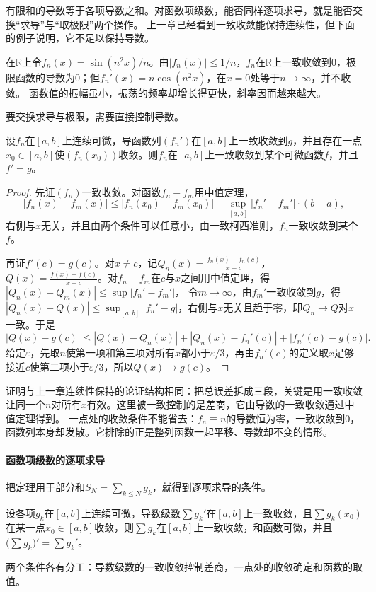 有限和的导数等于各项导数之和。对函数项级数，能否同样逐项求导，就是能否交换“求导”与“取极限”两个操作。
上一章已经看到一致收敛能保持连续性，但下面的例子说明，它不足以保持导数。
\begin{example}[一致收敛而导数不收敛的函数列]
\label{ex:ru-uniform-not-derivative}
在$\mathbb R$上令$f_n(x)=\sin(n^2x)/n$。由$|f_n(x)|\leq1/n$，$f_n$在$\mathbb R$上一致收敛到$0$，极限函数的导数为$0$；但$f_n'(x)=n\cos(n^2x)$，在$x=0$处等于$n\to\infty$，并不收敛。
函数值的振幅虽小，振荡的频率却增长得更快，斜率因而越来越大。
\end{example}
要交换求导与极限，需要直接控制导数。
\begin{theorem}[函数列的求导与极限交换]
\label{thm:ru-uniform-derivative-limit}
设$f_n$在$[a,b]$上连续可微，导函数列$(f_n')$在$[a,b]$上一致收敛到$g$，并且存在一点$x_0\in[a,b]$使$(f_n(x_0))$收敛。则$f_n$在$[a,b]$上一致收敛到某个可微函数$f$，并且$f'=g$。
\end{theorem}
\begin{proof}
先证$(f_n)$一致收敛。对函数$f_n-f_m$用中值定理，
\[
 |f_n(x)-f_m(x)|\leq|f_n(x_0)-f_m(x_0)|+\sup_{[a,b]}|f_n'-f_m'|\cdot(b-a),
\]
右侧与$x$无关，并且由两个条件可以任意小，由一致柯西准则，$f_n$一致收敛到某个$f$。

再证$f'(c)=g(c)$。对$x\neq c$，记$Q_n(x)=\frac{f_n(x)-f_n(c)}{x-c}$，$Q(x)=\frac{f(x)-f(c)}{x-c}$。对$f_n-f_m$在$c$与$x$之间用中值定理，得$|Q_n(x)-Q_m(x)|\leq\sup|f_n'-f_m'|$，
令$m\to\infty$，由$f_m'$一致收敛到$g$，得$|Q_n(x)-Q(x)|\leq\sup_{[a,b]}|f_n'-g|$，右侧与$x$无关且趋于零，即$Q_n\to Q$对$x$一致。于是
\[
 |Q(x)-g(c)|\leq|Q(x)-Q_n(x)|+|Q_n(x)-f_n'(c)|+|f_n'(c)-g(c)|.
\]
给定$\varepsilon$，先取$n$使第一项和第三项对所有$x$都小于$\varepsilon/3$，再由$f_n'(c)$的定义取$x$足够接近$c$使第二项小于$\varepsilon/3$，所以$Q(x)\to g(c)$。
\end{proof}
证明与上一章连续性保持的论证结构相同：把总误差拆成三段，关键是用一致收敛让同一个$n$对所有$x$有效。这里被一致控制的是差商，它由导数的一致收敛通过中值定理得到。
一点处的收敛条件不能省去：$f_n\equiv n$的导数恒为零，一致收敛到$0$，函数列本身却发散。它排除的正是整列函数一起平移、导数却不变的情形。

\paragraph{函数项级数的逐项求导}
把定理用于部分和$S_N=\sum_{k\leq N}g_k$，就得到逐项求导的条件。
\begin{theorem}[函数项级数的逐项求导]
\label{thm:ru-termwise-derivative}
设各项$g_k$在$[a,b]$上连续可微，导数级数$\sum g_k'$在$[a,b]$上一致收敛，且$\sum g_k(x_0)$在某一点$x_0\in[a,b]$收敛，则$\sum g_k$在$[a,b]$上一致收敛，和函数可微，并且$\bigl(\sum g_k\bigr)'=\sum g_k'$。
\end{theorem}
两个条件各有分工：导数级数的一致收敛控制差商，一点处的收敛确定和函数的取值。

